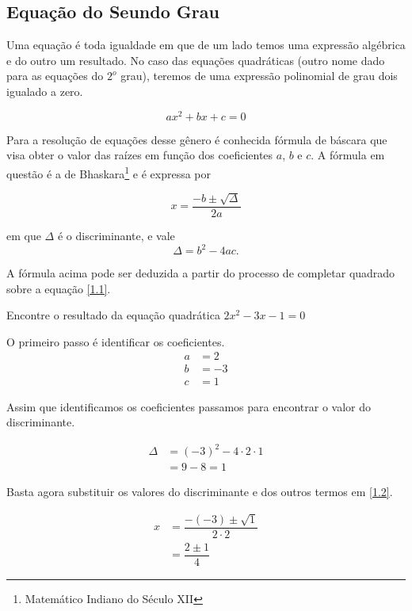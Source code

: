 \subsection{Equação do Seundo Grau}

Uma equação é toda igualdade em que de um lado temos uma expressão algébrica e do outro um resultado. No caso das equações quadráticas (outro nome dado para as equações do $2^o$ grau), teremos de uma expressão polinomial de grau dois igualado a zero.

\begin{equation}\label{1.1}
    ax^2+bx+c=0
\end{equation}

Para a resolução de equações desse gênero é conhecida fórmula de báscara que visa obter o valor das raízes em função dos coeficientes $a$, $b$ e $c$. A fórmula em questão é a de Bhaskara\footnote{Matemático Indiano do Século XII} e é expressa por

\begin{equation}\label{1.2}
    x=\dfrac{-b \pm \sqrt{\Delta}}{2a}
\end{equation}

em que $\Delta$ é o discriminante, e vale
\begin{equation}\label{1.3}
    \Delta=b^2-4ac.
\end{equation}

A fórmula acima pode ser deduzida a partir do processo de completar quadrado sobre a equação \eqref{1.1}.

\begin{exe}
Encontre o resultado da equação quadrática $2x^2-3x-1=0$
\end{exe}
O primeiro passo é identificar os coeficientes. 
\begin{align*}
    a&=2\\
    b&=-3\\
    c&=1
\end{align*}

Assim que identificamos os coeficientes passamos para encontrar o valor do discriminante.

\begin{align*}
    \Delta&=(-3)^2-4\cdot 2 \cdot 1\\
    &=9-8=1
\end{align*}

Basta agora substituir os valores do discriminante e dos outros termos em \eqref{1.2}.

\begin{align*}
    x&=\dfrac{-(-3)\pm \sqrt{1}}{2\cdot 2}\\
    &=\dfrac{2\pm 1}{4}
\end{align*}    
 
